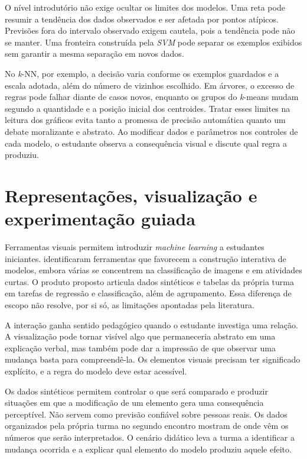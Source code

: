 O nível introdutório não exige ocultar os limites dos modelos. Uma reta pode resumir a tendência dos dados observados e ser afetada por pontos atípicos. Previsões fora do intervalo observado exigem cautela, pois a tendência pode não se manter. Uma fronteira construída pela \textit{SVM} pode separar os exemplos exibidos sem garantir a mesma separação em novos dados.

No \textit{k}-NN, por exemplo, a decisão varia conforme os exemplos guardados e a escala adotada, além do número de vizinhos escolhido. Em árvores, o excesso de regras pode falhar diante de casos novos, enquanto os grupos do \textit{k}-means mudam segundo a quantidade e a posição inicial dos centroides. Tratar esses limites na leitura dos gráficos evita tanto a promessa de precisão automática quanto um debate moralizante e abstrato. Ao modificar dados e parâmetros nos controles de cada modelo, o estudante observa a consequência visual e discute qual regra a produziu.

\section{Representações, visualização e experimentação guiada}

Ferramentas visuais permitem introduzir \textit{machine learning} a estudantes iniciantes.  identificaram ferramentas que favorecem a construção interativa de modelos, embora várias se concentrem na classificação de imagens e em atividades curtas. O produto proposto articula dados sintéticos e tabelas da própria turma em tarefas de regressão e classificação, além de agrupamento. Essa diferença de escopo não resolve, por si só, as limitações apontadas pela literatura.

A interação ganha sentido pedagógico quando o estudante investiga uma relação. A visualização pode tornar visível algo que permaneceria abstrato em uma explicação verbal, mas também pode dar a impressão de que observar uma mudança basta para compreendê-la. Os elementos visuais precisam ter significado explícito, e a regra do modelo deve estar acessível.

Os dados sintéticos permitem controlar o que será comparado e produzir situações em que a modificação de um elemento gera uma consequência perceptível. Não servem como previsão confiável sobre pessoas reais. Os dados organizados pela própria turma no segundo encontro mostram de onde vêm os números que serão interpretados. O cenário didático leva a turma a identificar a mudança ocorrida e a explicar qual elemento do modelo produziu aquele efeito.

